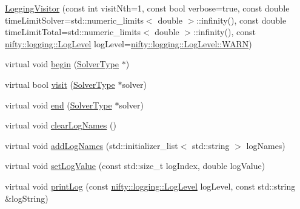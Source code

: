 \begin{DoxyCompactItemize}
\item 
\hyperlink{classnifty_1_1graph_1_1optimization_1_1common_1_1LoggingVisitor_af37d19689243f420e3fd499feddf825c}{Logging\+Visitor} (const int visit\+Nth=1, const bool verbose=true, const double time\+Limit\+Solver=std\+::numeric\+\_\+limits$<$ double $>$\+::infinity(), const double time\+Limit\+Total=std\+::numeric\+\_\+limits$<$ double $>$\+::infinity(), const \hyperlink{namespacenifty_1_1logging_a3385625f9a0dbb17f70c47d3fca2f64d}{nifty\+::logging\+::\+Log\+Level} log\+Level=\hyperlink{namespacenifty_1_1logging_a3385625f9a0dbb17f70c47d3fca2f64da32bd8a1db2275458673903bdb84cb277}{nifty\+::logging\+::\+Log\+Level\+::\+W\+A\+R\+N})
\item 
virtual void \hyperlink{classnifty_1_1graph_1_1optimization_1_1common_1_1LoggingVisitor_a0d371764a35038bb959c30787ee27115}{begin} (\hyperlink{classnifty_1_1graph_1_1optimization_1_1common_1_1LoggingVisitor_a948f90213104a37e586b5024cb918f40}{Solver\+Type} $\ast$)
\item 
virtual bool \hyperlink{classnifty_1_1graph_1_1optimization_1_1common_1_1LoggingVisitor_a09686da1cd21063cf5fbe6c80fd7eaf2}{visit} (\hyperlink{classnifty_1_1graph_1_1optimization_1_1common_1_1LoggingVisitor_a948f90213104a37e586b5024cb918f40}{Solver\+Type} $\ast$solver)
\item 
virtual void \hyperlink{classnifty_1_1graph_1_1optimization_1_1common_1_1LoggingVisitor_a2d4504dd47356f50e59a79e13e826e64}{end} (\hyperlink{classnifty_1_1graph_1_1optimization_1_1common_1_1LoggingVisitor_a948f90213104a37e586b5024cb918f40}{Solver\+Type} $\ast$solver)
\item 
virtual void \hyperlink{classnifty_1_1graph_1_1optimization_1_1common_1_1LoggingVisitor_ab0c92d5a637a2f4184bc8b3616b7c1d7}{clear\+Log\+Names} ()
\item 
virtual void \hyperlink{classnifty_1_1graph_1_1optimization_1_1common_1_1LoggingVisitor_a937aea0724cef965a33c13f80600e5d3}{add\+Log\+Names} (std\+::initializer\+\_\+list$<$ std\+::string $>$ log\+Names)
\item 
virtual void \hyperlink{classnifty_1_1graph_1_1optimization_1_1common_1_1LoggingVisitor_aa690344d8a8a88da98a2f27d2f1a8f1f}{set\+Log\+Value} (const std\+::size\+\_\+t log\+Index, double log\+Value)
\item 
virtual void \hyperlink{classnifty_1_1graph_1_1optimization_1_1common_1_1LoggingVisitor_adb75d5a267ca5465a9d01a88fd160e74}{print\+Log} (const \hyperlink{namespacenifty_1_1logging_a3385625f9a0dbb17f70c47d3fca2f64d}{nifty\+::logging\+::\+Log\+Level} log\+Level, const std\+::string \&log\+String)

\end{DoxyCompactItemize}
